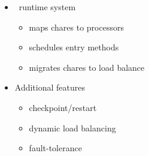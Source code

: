 \begin{frame}[fragile]
\begin{minipage}[t]{2.50in}
\begin{itemize}
\begin{itemize}
  \end{itemize}
\ \\ \pause
\item \charm\ runtime system
  \begin{itemize}
  \item maps chares to processors
  \item schedules entry methods
  \item migrates chares to load balance
  \end{itemize} \pause
\item Additional features
\begin{itemize}
\item checkpoint/restart
\item dynamic load balancing
\item fault-tolerance
\end{itemize}
\end{itemize}
\end{minipage}
\end{frame}



